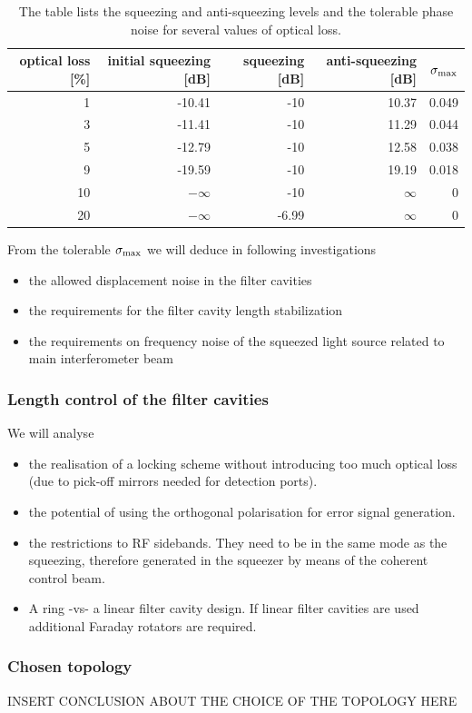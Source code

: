 \begin{table}[h]
\begin{center}
\begin{tabular}{rrrrr}
\hline
\hline
optical loss [\%]& initial squeezing [dB] & squeezing [dB] & anti-squeezing [dB] & $\sigma_{\rm max}$ \\
\hline
1 & -10.41 & -10 & 10.37 & 0.049\\
3 & -11.41 & -10 & 11.29 & 0.044\\
5 & -12.79 & -10 & 12.58 & 0.038\\
9 & -19.59 & -10 & 19.19& 0.018 \\
10 & $-\infty$ & -10 & $\infty$ & 0\\
20 & $-\infty$ & -6.99 & $\infty$ & 0\\
\hline
\hline
\end{tabular}
\end{center}
\caption{The table lists  the squeezing and anti-squeezing levels and the tolerable phase noise for several values of optical loss.}
\label{tab:phsnoiselimit}
\end{table}

From the tolerable $\sigma_{\rm max}$ we will deduce in following investigations
\begin{itemize}
\item{the allowed displacement noise in the  filter cavities}
\item{the requirements for the filter cavity length stabilization}
\item{the requirements on frequency noise of the squeezed light source related to main interferometer beam}
\end{itemize}
\FloatBarrier
\subsubsection{Length control of the filter cavities}
We will analyse
\begin{itemize}
\item{the realisation of a locking scheme without introducing too much optical loss (due to pick-off mirrors needed for detection ports). }
\item{the potential of using the orthogonal polarisation for error signal generation.}
\item{the restrictions to RF sidebands. They need to be in the same mode as the squeezing, therefore generated in the squeezer by means of the coherent control beam.}
\item{A ring -vs- a linear filter cavity design. If linear filter cavities are used additional Faraday rotators are required.}
\end{itemize}

\subsubsection{Chosen topology}\label{subsubsec:chosentopo}
\textcolor[rgb]{0.98,0.00,0.00}{INSERT CONCLUSION ABOUT THE CHOICE OF THE TOPOLOGY HERE}


